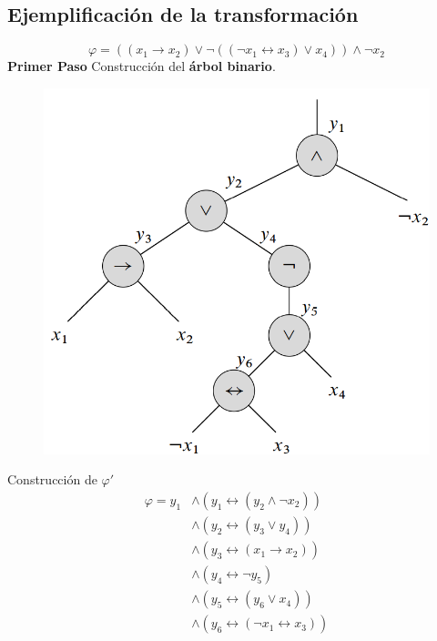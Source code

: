 \documentclass[a4paper]{article}
\begin{document}
\subsection{Ejemplificación de la transformación}
\noindent
\[
    \varphi = \left(\left(x_{1} \longrightarrow x_{2}\right) \lor \neg \left(\left(\neg x_{1} \longleftrightarrow x_{3}\right) \lor x_{4}\right)\right) \land \neg x_{2}
\]
\textbf{Primer Paso}
\newline 
Construcción del \textbf{árbol binario}.
\newline
\begin{figure}[H]
    \includegraphics[scale=0.3]{imgs/binary_tree.png}
\end{figure}
Construcción de \(\varphi'\)
\begin{align*}
    \varphi = y_{1} &\land \left(y_{1} \longleftrightarrow \left(y_{2} \land \neg x_{2}\right)\right) \\
                    &\land \left(y_{2} \longleftrightarrow \left(y_{3} \lor y_{4}\right)\right) \\
                    &\land \left(y_{3} \longleftrightarrow \left(x_{1} \longrightarrow x_{2}\right)\right) \\
                    &\land \left(y_{4} \longleftrightarrow \neg y_{5}\right) \\
                    &\land \left(y_{5} \longleftrightarrow \left(y_{6} \lor x_{4}\right)\right) \\
                    &\land \left(y_{6} \longleftrightarrow \left(\neg x_{1} \longleftrightarrow x_{3}\right)\right)
\end{align*}
\end{document}
